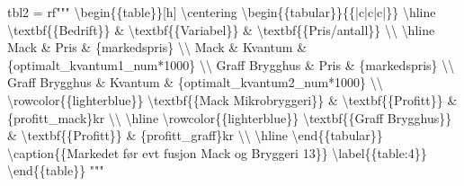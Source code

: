 \documentclass[
  12pt,
  a4paper,
  DIV=11,
  numbers=noendperiod]{scrartcl}
\newenvironment{Shaded}{\begin{snugshade}}{\end{snugshade}}
\newcommand{\CharTok}[1]{\textcolor[rgb]{0.13,0.47,0.30}{#1}}
\newcommand{\DecValTok}[1]{\textcolor[rgb]{0.68,0.00,0.00}{#1}}
\newcommand{\NormalTok}[1]{\textcolor[rgb]{0.00,0.23,0.31}{#1}}
\newcommand{\OperatorTok}[1]{\textcolor[rgb]{0.37,0.37,0.37}{#1}}
\newcommand{\SpecialCharTok}[1]{\textcolor[rgb]{0.37,0.37,0.37}{#1}}
\newcommand{\VerbatimStringTok}[1]{\textcolor[rgb]{0.13,0.47,0.30}{#1}}
\begin{document}
\begin{Shaded}
\begin{Highlighting}[]
\NormalTok{tbl2 }\OperatorTok{=} \VerbatimStringTok{rf"""}
\VerbatimStringTok{\textbackslash{}begin}\CharTok{\{\{}\VerbatimStringTok{table}\CharTok{\}\}}\VerbatimStringTok{[h]}
\VerbatimStringTok{\textbackslash{}centering}
\VerbatimStringTok{\textbackslash{}begin}\CharTok{\{\{}\VerbatimStringTok{tabular}\CharTok{\}\}\{\{}\VerbatimStringTok{|c|c|c|}\CharTok{\}\}}
\VerbatimStringTok{\textbackslash{}hline}
\VerbatimStringTok{\textbackslash{}textbf}\CharTok{\{\{}\VerbatimStringTok{Bedrift}\CharTok{\}\}}\VerbatimStringTok{ \& \textbackslash{}textbf}\CharTok{\{\{}\VerbatimStringTok{Variabel}\CharTok{\}\}}\VerbatimStringTok{ \& \textbackslash{}textbf}\CharTok{\{\{}\VerbatimStringTok{Pris/antall}\CharTok{\}\}}\VerbatimStringTok{ \textbackslash{}\textbackslash{}}
\VerbatimStringTok{\textbackslash{}hline}
\VerbatimStringTok{Mack \& Pris \& }\SpecialCharTok{\{}\NormalTok{markedspris}\SpecialCharTok{\}}\VerbatimStringTok{ \textbackslash{}\textbackslash{}}
\VerbatimStringTok{Mack \& Kvantum \& }\SpecialCharTok{\{}\NormalTok{optimalt\_kvantum1\_num}\OperatorTok{*}\DecValTok{1000}\SpecialCharTok{\}}\VerbatimStringTok{ \textbackslash{}\textbackslash{}}
\VerbatimStringTok{Graff Brygghus \& Pris \& }\SpecialCharTok{\{}\NormalTok{markedspris}\SpecialCharTok{\}}\VerbatimStringTok{ \textbackslash{}\textbackslash{}}
\VerbatimStringTok{Graff Brygghus \& Kvantum \& }\SpecialCharTok{\{}\NormalTok{optimalt\_kvantum2\_num}\OperatorTok{*}\DecValTok{1000}\SpecialCharTok{\}}\VerbatimStringTok{ \textbackslash{}\textbackslash{}}
\VerbatimStringTok{\textbackslash{}rowcolor}\CharTok{\{\{}\VerbatimStringTok{lighterblue}\CharTok{\}\}}\VerbatimStringTok{ \textbackslash{}textbf}\CharTok{\{\{}\VerbatimStringTok{Mack Mikrobryggeri}\CharTok{\}\}}\VerbatimStringTok{ \& \textbackslash{}textbf}\CharTok{\{\{}\VerbatimStringTok{Profitt}\CharTok{\}\}}\VerbatimStringTok{ \& }\SpecialCharTok{\{}\NormalTok{profitt\_mack}\SpecialCharTok{\}}\VerbatimStringTok{kr \textbackslash{}\textbackslash{} \textbackslash{}hline}
\VerbatimStringTok{\textbackslash{}rowcolor}\CharTok{\{\{}\VerbatimStringTok{lighterblue}\CharTok{\}\}}\VerbatimStringTok{ \textbackslash{}textbf}\CharTok{\{\{}\VerbatimStringTok{Graff Brygghus}\CharTok{\}\}}\VerbatimStringTok{ \& \textbackslash{}textbf}\CharTok{\{\{}\VerbatimStringTok{Profitt}\CharTok{\}\}}\VerbatimStringTok{ \& }\SpecialCharTok{\{}\NormalTok{profitt\_graff}\SpecialCharTok{\}}\VerbatimStringTok{kr \textbackslash{}\textbackslash{} \textbackslash{}hline}
\VerbatimStringTok{\textbackslash{}end}\CharTok{\{\{}\VerbatimStringTok{tabular}\CharTok{\}\}}
\VerbatimStringTok{\textbackslash{}caption}\CharTok{\{\{}\VerbatimStringTok{Markedet før evt fusjon Mack og Bryggeri 13}\CharTok{\}\}}
\VerbatimStringTok{\textbackslash{}label}\CharTok{\{\{}\VerbatimStringTok{table:4}\CharTok{\}\}}
\VerbatimStringTok{\textbackslash{}end}\CharTok{\{\{}\VerbatimStringTok{table}\CharTok{\}\}}
\VerbatimStringTok{"""}





\end{Highlighting}
\end{Shaded}
\end{document}
